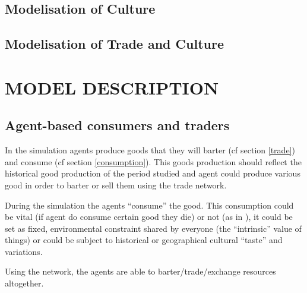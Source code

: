 \documentclass{wscpaperproc}
\begin{document}
\subsection{Modelisation of Culture}

\subsection{Modelisation of Trade and Culture}


\section{MODEL DESCRIPTION}

\subsection{Agent-based consumers and traders}

In the simulation agents produce goods that they will barter (cf section \ref{trade}) and consume (cf section \ref{consumption}). This goods production should reflect the historical good production of the period studied and agent could produce various good in order to barter or sell them using the trade network.

During the simulation the agents ``consume'' the good. This consumption could be vital (if agent do consume certain good they die) or not (as in \cite{macmillan_agent-based_2008}), it could be set as fixed, environmental constraint shared by everyone (the ``intrinsic'' value of things) or could be subject to historical or geographical cultural ``taste'' and variations.

Using the network, the agents are able to barter/trade/exchange resources altogether. 
\end{document}

